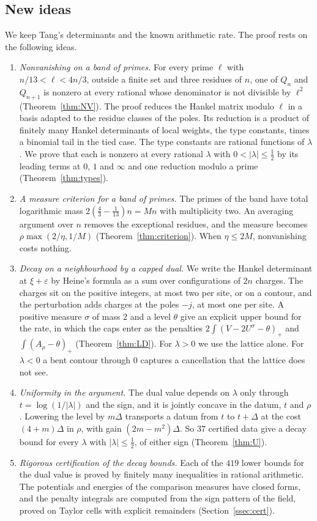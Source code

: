 \documentclass[11pt]{amsart}
\theoremstyle{definition}
\theoremstyle{remark}
\numberwithin{equation}{section}
\begin{document}
\subsection{New ideas}
We keep Tang's determinants and the known arithmetic rate. The proof rests on the following ideas.
\begin{enumerate}[leftmargin=*]
\item \emph{Nonvanishing on a band of primes.} For every prime $\ell$ with $n/13<\ell<4n/3$, outside a finite set
 and three residues of $n$, one of $Q_n$ and $Q_{n+1}$ is nonzero at every rational whose denominator is not
 divisible by $\ell^2$ (Theorem~\ref{thm:NV}). The proof reduces the Hankel matrix modulo $\ell$ in a basis adapted to the
 residue classes of the poles. Its reduction is a product of finitely many Hankel determinants of local weights, the
 type constants, times a binomial tail in the tied case. The type constants are rational functions of $\lambda$. We
 prove that each is nonzero at every rational $\lambda$ with $0<|\lambda|\le\frac12$ by its leading terms at $0$, $1$
 and $\infty$ and one reduction modulo a prime (Theorem~\ref{thm:types}).
\item \emph{A measure criterion for a band of primes.} The primes of the band have total logarithmic mass
 $2(\frac43-\frac1{13})n=Mn$ with multiplicity two. An averaging argument over $n$ removes the exceptional residues, and
 the measure becomes $\rho\max(2/\eta,1/M)$ (Theorem~\ref{thm:criterion}). When $\eta\le2M$, nonvanishing costs nothing.
\item \emph{Decay on a neighbourhood by a capped dual.} We write the Hankel determinant at $\xi+\varepsilon$ by Heine's
 formula as a sum over configurations of $2n$ charges. The charges sit on the positive integers, at most two per site,
 or on a contour, and the perturbation adds charges at the poles $-j$, at most one per site. A positive measure
 $\sigma$ of mass $2$ and a level $\theta$ give an explicit upper bound for the rate, in which the caps enter as the
 penalties $2\int(V-2U^\sigma-\theta)_+$ and $\int(A_\rho-\theta)_+$ (Theorem~\ref{thm:LD}). For $\lambda>0$ we use the
 lattice alone. For $\lambda<0$ a bent contour through $0$ captures a cancellation that the lattice does not see.
\item \emph{Uniformity in the argument.} The dual value depends on $\lambda$ only through $t=\log(1/|\lambda|)$ and the
 sign, and it is jointly concave in the datum, $t$ and $\rho$. Lowering the level by $m\Delta$ transports a datum from
 $t$ to $t+\Delta$ at the cost $(4+m)\Delta$ in $\rho$, with gain $(2m-m^2)\Delta$. So $37$ certified data give a decay
 bound for every $\lambda$ with $|\lambda|\le\frac12$, of either sign (Theorem~\ref{thm:U}).
\item \emph{Rigorous certification of the decay bounds.} Each of the $419$ lower bounds for the dual value is proved by
 finitely many inequalities in rational arithmetic. The potentials and energies of the comparison measures have closed
 forms, and the penalty integrals are computed from the sign pattern of the field, proved on Taylor cells with explicit
 remainders (Section~\ref{ssec:cert}).
\end{enumerate}
\end{document}
